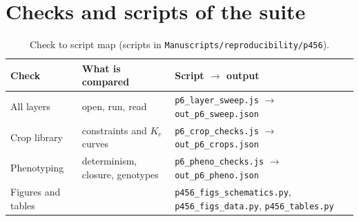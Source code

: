 \section{Checks and scripts of the suite}\label{app:repro6}
\begin{table}[H]\centering\small
\caption{Check to script map (scripts in \texttt{Manuscripts/reproducibility/p456}).}
\begin{tabularx}{\textwidth}{>{\raggedright\arraybackslash}p{4.2cm}>{\raggedright\arraybackslash}p{4.0cm}X}
\toprule Check & What is compared & Script $\to$ output\\\midrule
All layers & open, run, read & \texttt{p6\_layer\_sweep.js} $\to$ \texttt{out\_p6\_sweep.json}\\
Crop library & constraints and $K_c$ curves & \texttt{p6\_crop\_checks.js} $\to$ \texttt{out\_p6\_crops.json}\\
Phenotyping & determinism, closure, genotypes & \texttt{p6\_pheno\_checks.js} $\to$ \texttt{out\_p6\_pheno.json}\\
Figures and tables & & \texttt{p456\_figs\_schematics.py}, \texttt{p456\_figs\_data.py}, \texttt{p456\_tables.py}\\\bottomrule
\end{tabularx}
\end{table}

